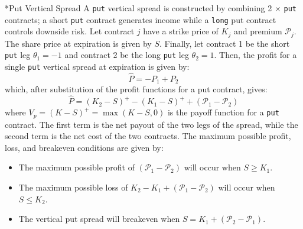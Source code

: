 \documentclass[11pt]{article}
\makeatletter
\theoremstyle{definition}
\renewcommand\subsubsection{\@startsection
	{subsubsection}{2}{0mm}
	{-0.05in}
	{-0.5\baselineskip}
	{\normalfont\normalsize\itshape\bfseries}}
\makeatother
\begin{document}
\subsubsection*{Put Vertical Spread}
A \texttt{put} vertical spread is constructed by combining 2 $\times$ \texttt{put} contracts; a short \texttt{put} contract generates income while a \texttt{long} put contract controls downside risk.  
Let contract $j$ have a strike price of $K_{j}$ and premium $\mathcal{P}_{j}$. 
The share price at expiration is given by $S$. 
Finally, let contract 1 be the short \texttt{put} leg $\theta_{1} = -1$ and contract 2 be the long \texttt{put} leg $\theta_{2} = 1$. 
Then, the profit for a single \texttt{put} vertical spread at expiration is given by:
\begin{equation}
\hat{P} = -P_{1}+P_{2}
\end{equation}
which, after substitution of the profit functions for a put contract, gives:
\begin{equation}
\hat{P} = \left(K_{2} - S\right)^{+} - \left(K_{1} - S\right)^{+} + \left(\mathcal{P}_{1} - \mathcal{P}_{2}\right)
\end{equation}
where $V_{p} = (K-S)^{+}=\max(K-S,0)$ is the payoff function for a \texttt{put} contract. 
The first term is the net payout of the two legs of the spread, while the second term is the net cost of the two contracts. 
The maximum possible profit, loss, and breakeven conditions are given by:
\begin{itemize}
\item{The maximum possible profit of $\left(\mathcal{P}_{1} - \mathcal{P}_{2}\right)$ will occur when $S\geq{K_{1}}$.}
\item{The maximum possible loss of $K_{2} - K_{1} + \left(\mathcal{P}_{1} - \mathcal{P}_{2}\right)$ will occur when $S\leq{K_{2}}$.}
\item{The vertical put spread will breakeven when $S =  K_{1}+\left(\mathcal{P}_{2} - \mathcal{P}_{1}\right)$.}
\end{itemize}
\end{document}
